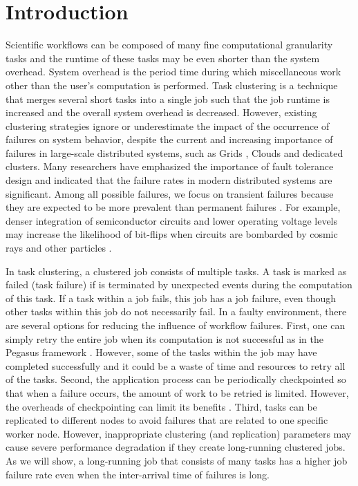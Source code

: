 \documentclass{IOS-Book-Article}
\begin{document}
\section*{Introduction}


Scientific workflows can be composed of many fine computational granularity tasks and the runtime of these tasks may be even shorter than the system overhead. System overhead is the period time during which miscellaneous work other than the user’s computation is performed. Task clustering \cite{Chen2013, Singh2008, Chen2012, Maheshwari2012, Ferreira-granularity-2013, Integration2012} is a technique that merges several short tasks into a single job such that the job runtime is increased and the overall system overhead is decreased. However, existing clustering strategies ignore or underestimate the impact of the occurrence of failures on system behavior, despite the current and increasing importance of failures in large-scale distributed systems, such as Grids \cite{Bresnahan2011, Deelman2004, Rubing2005}, Clouds \cite{Deelman2008, Berriman2010, Bresnahan2011} and dedicated clusters. Many researchers \cite{Zhang2004, Tang1990, Schroeder2006, Sahoo2004} have emphasized the importance of fault tolerance design and indicated that the failure rates in modern distributed systems are significant. Among all possible failures, we focus on transient failures because they are expected to be more prevalent than permanent failures \cite{Zhang2004}. For example, denser integration of semiconductor circuits and lower operating voltage levels may increase the likelihood of bit-flips when circuits are bombarded by cosmic rays and other particles \cite{Zhang2004}. 

In task clustering, a clustered job consists of multiple tasks. A task is marked as failed (task failure) if is terminated by unexpected events during the computation of this task. If a task within a job fails, this job has a job failure, even though other tasks within this job do not necessarily fail. 
In a faulty environment, there are several options for reducing the influence of workflow failures. First, one can simply retry the entire job when its computation is not successful as in the Pegasus framework \cite{Deelman2004}. However, some of the tasks within the job may have completed successfully and it could be a waste of time and resources to retry all of the tasks. Second, the application process can be periodically checkpointed so that when a failure occurs, the amount of work to be retried is limited. However, the overheads of checkpointing can limit its benefits \cite{Zhang2004}. Third, tasks can be replicated to different nodes to avoid failures that are related to one specific worker node. However, inappropriate clustering (and replication) parameters may cause severe performance degradation if they create long-running clustered jobs. As we will show, a long-running job that consists of many tasks has a higher job failure rate even when the inter-arrival time of failures is long. 
\end{document}
